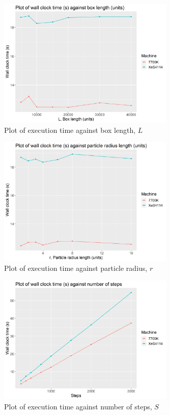 \documentclass[12pt]{article}
\begin{document}
\begin{figure}[H]
    \centering
    \includegraphics[width=0.75\textwidth]{./processedResults/seq-varyL}
    \caption{Plot of execution time against box length, $L$}
    \label{fig:seq-varyL}
\end{figure}

\begin{figure}[H]
    \centering
    \includegraphics[width=0.75\textwidth]{./processedResults/seq-varyR}
    \caption{Plot of execution time against particle radius, $r$}
    \label{fig:seq-varyR}
\end{figure}

\begin{figure}[H]
    \centering
    \includegraphics[width=0.75\textwidth]{./processedResults/seq-varySteps}
    \caption{Plot of execution time against number of steps, $S$}
    \label{fig:seq-varySteps}
\end{figure}
\end{document}
